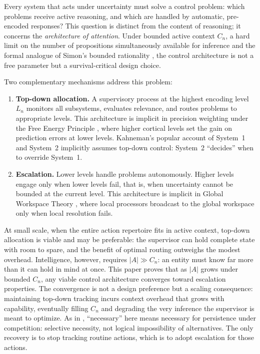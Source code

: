 \documentclass[11pt]{article}
\theoremstyle{definition}
\begin{document}
Every system that acts under uncertainty must solve a control problem:
which problems receive active reasoning, and which are handled by
automatic, pre-encoded responses? This question is distinct from the
content of reasoning; it concerns the \emph{architecture of
attention}. Under bounded active context $C_n$, a hard limit on the
number of propositions simultaneously available for inference and the
formal analogue of Simon's bounded rationality
\cite{Simon1955,Simon1962}, the control architecture is not a free
parameter but a survival-critical design choice.

Two complementary mechanisms address this problem:

\begin{enumerate}
\item \textbf{Top-down allocation.} A supervisory process at the
   highest encoding level $L_n$ monitors all subsystems, evaluates
   relevance, and routes problems to appropriate levels. This
   architecture is implicit in precision weighting under the Free
   Energy Principle \cite{Friston2010,Friston2017}, where higher
   cortical levels set the gain on prediction errors at lower levels.
   Kahneman's popular
   account of System~1 and System~2 \cite{Kahneman2011} implicitly
   assumes top-down control: System~2 ``decides'' when to override
   System~1.

\item \textbf{Escalation.} Lower levels handle problems autonomously.
   Higher levels engage only when lower levels fail, that is, when
   uncertainty cannot be bounded at the current level. This
   architecture is implicit in Global Workspace Theory
   \cite{Baars1988,Dehaene2011}, where local processors broadcast to
   the global workspace only when local resolution fails.
\end{enumerate}

At small scale, when the entire action repertoire fits in active
context, top-down allocation is viable and may be preferable: the
supervisor can hold complete state with room to spare, and the benefit
of optimal routing outweighs the modest overhead. Intelligence,
however, requires $|A| \gg C_n$: an entity must know far more than it
can hold in mind at once. This paper proves that as $|A|$ grows under
bounded $C_n$, any viable control architecture converges toward
escalation properties. The convergence is not a design preference but
a scaling consequence: maintaining top-down tracking incurs context
overhead that grows with capability, eventually filling $C_n$ and
degrading the very inference the supervisor is meant to optimize.
As in \cite{McCarthy2026a}, ``necessary'' here means necessary for
persistence under competition: selective necessity, not logical
impossibility of alternatives. The
only recovery is to stop tracking routine actions, which is to adopt
escalation for those actions.
\end{document}
